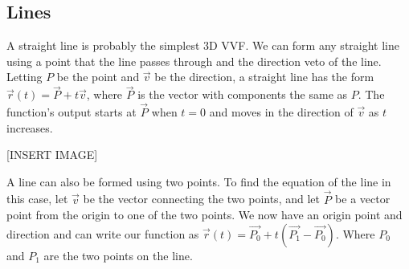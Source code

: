 \subsection{Lines}
\noindent
A straight line is probably the simplest 3D VVF. We can form any straight line using a point that the line passes through and the direction veto of the line.\\
Letting $P$ be the point and $\vec{v}$ be the direction, a straight line has the form $\vec{r}(t)=\vec{P}+t\vec{v}$, where $\vec{P}$ is the vector with components the same as $P$. The function's output starts at $\vec{P}$ when $t=0$ and moves in the direction of $\vec{v}$ as $t$ increases.

[INSERT IMAGE]

\noindent
A line can also be formed using two points. To find the equation of the line in this case, let $\vec{v}$ be the vector connecting the two points, and let $\vec{P}$ be a vector point from the origin to one of the two points. We now have an origin point and direction and can write our function as $\vec{r}(t)=\vec{P_0}+t\left(\vec{P_1}-\vec{P_0}\right)$. Where $P_0$ and $P_1$ are the two points on the line.